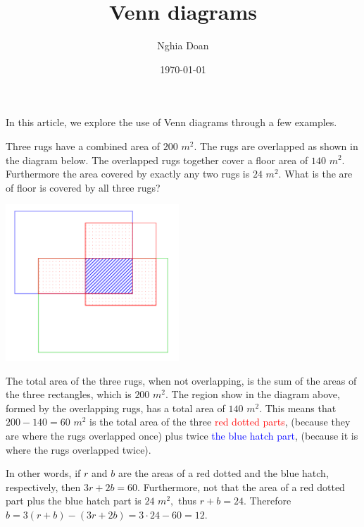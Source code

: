 \documentclass{article}
\title{Venn diagrams}
\author{Nghia Doan}
\date{\today}
\begin{document}
\maketitle

In this article, we explore the use of Venn diagrams through a few examples.

\begin{example*}

    Three rugs have a combined area of $200$ $m^2.$ The rugs are overlapped as shown in the diagram below.
    The overlapped rugs together cover a floor area of $140$ $m^2.$ Furthermore the area covered by exactly any two rugs is $24$ $m^2$. 
	What is the are of floor is covered by all three rugs?
\end{example*}

\begin{center}
    \includegraphics[width=6.5cm]{./svg/pdf/pi-2023-01-01.pdf}
\end{center}

\begin{soln}
    The total area of the three rugs, when not overlapping, is the sum of the areas of the three rectangles, which is $200$ $m^2.$
    The region show in the diagram above, formed by the overlapping rugs, has a total area of $140$ $m^2.$
	This means that $200-140=60$ $m^2$ is the total area of the three \textcolor{red}{red dotted parts},
    (because they are where the rugs overlapped once) plus twice \textcolor{blue}{the blue hatch part},
    (because it is where the rugs overlapped twice).

    In other words, if $r$ and $b$ are the areas of a red dotted and the blue hatch, respectively, then $3r + 2b = 60.$
    Furthermore, not that the area of a red dotted part plus the blue hatch part is $24$ $m^2,$ thus $r + b = 24.$
    Therefore $b = 3(r + b)- (3r+2b) = 3 \cdot 24 - 60 = \boxed{12}.$
\end{soln}
\end{document}
